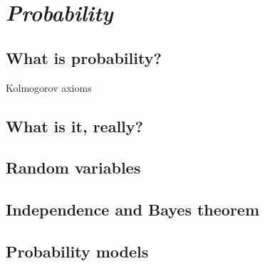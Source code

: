 \chapter{\emph{Probability}} 
\label{probability}

\section{What is probability?}
Kolmogorov axioms

\section{What is it, really?}

\section{Random variables}

\section{Independence and Bayes theorem}

\section{Probability models}
